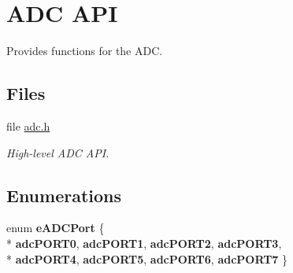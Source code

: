 \hypertarget{group___a_d_c}{\section{A\-D\-C A\-P\-I}
\label{group___a_d_c}
}


Provides functions for the A\-D\-C.  


\subsection*{Files}
\begin{DoxyCompactItemize}
\item 
file \hyperlink{adc_8h}{adc.\-h}
\begin{DoxyCompactList}\small\item\em High-\/level A\-D\-C A\-P\-I. \end{DoxyCompactList}\end{DoxyCompactItemize}
\subsection*{Enumerations}
\begin{DoxyCompactItemize}
\item 
enum {\bfseries e\-A\-D\-C\-Port} \{ \\*
{\bfseries adc\-P\-O\-R\-T0}, 
{\bfseries adc\-P\-O\-R\-T1}, 
{\bfseries adc\-P\-O\-R\-T2}, 
{\bfseries adc\-P\-O\-R\-T3}, 
\\*
{\bfseries adc\-P\-O\-R\-T4}, 
{\bfseries adc\-P\-O\-R\-T5}, 
{\bfseries adc\-P\-O\-R\-T6}, 
{\bfseries adc\-P\-O\-R\-T7}
 \}
\end{DoxyCompactItemize}
